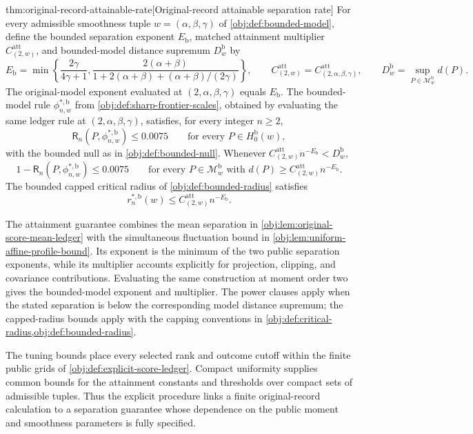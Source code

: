 \documentclass[11pt]{article}
\begin{document}
\begin{theoremv}{thm:original-record-attainable-rate}[Original-record attainable separation rate]
For every admissible smoothness tuple \(w=(\alpha,\beta,\gamma)\) of \cref{obj:def:bounded-model}, define the bounded separation exponent \(E_{\mathrm b}\), matched attainment multiplier \(C^{\mathrm{att}}_{(2,w)}\), and bounded-model distance supremum \(D_w^{\mathrm b}\) by
\[
E_{\mathrm b}
=\min\left\{\frac{2\gamma}{4\gamma+1},
\frac{2(\alpha+\beta)}
{1+2(\alpha+\beta)+(\alpha+\beta)/(2\gamma)}\right\},
\qquad
C^{\mathrm{att}}_{(2,w)}
=C^{\mathrm{att}}_{(2,\alpha,\beta,\gamma)},
\qquad
D_w^{\mathrm b}=\sup_{P\in\mathcal M^{\mathrm b}_w}d(P).
\]
The original-model exponent evaluated at \((2,\alpha,\beta,\gamma)\) equals \(E_{\mathrm b}\). The bounded-model rule \(\phi^{*,\mathrm b}_{n,w}\) from \cref{obj:def:sharp-frontier-scales}, obtained by evaluating the same ledger rule at \((2,\alpha,\beta,\gamma)\), satisfies, for every integer \(n\ge2\),
\[
\mathsf R_n(P,\phi^{*,\mathrm b}_{n,w})\le0.0075
\qquad\text{for every }P\in H_0^{\mathrm b}(w),
\]
with the bounded null as in \cref{obj:def:bounded-null}. Whenever
\(C^{\mathrm{att}}_{(2,w)}n^{-E_{\mathrm b}}<D_w^{\mathrm b}\),
\[
1-\mathsf R_n(P,\phi^{*,\mathrm b}_{n,w})\le0.0075
\qquad
\text{for every }P\in\mathcal M^{\mathrm b}_w
\text{ with }d(P)\ge C^{\mathrm{att}}_{(2,w)}n^{-E_{\mathrm b}}.
\]
The bounded capped critical radius of \cref{obj:def:bounded-radius} satisfies
\[
r_n^{*,\mathrm b}(w)
\le C^{\mathrm{att}}_{(2,w)}n^{-E_{\mathrm b}}.
\]
\end{theoremv}

The attainment guarantee combines the mean separation in \cref{obj:lem:original-score-mean-ledger} with the simultaneous fluctuation bound in \cref{obj:lem:uniform-affine-profile-bound}. Its exponent is the minimum of the two public separation exponents, while its multiplier accounts explicitly for projection, clipping, and covariance contributions. Evaluating the same construction at moment order two gives the bounded-model exponent and multiplier. The power clauses apply when the stated separation is below the corresponding model distance supremum; the capped-radius bounds apply with the capping conventions in \cref{obj:def:critical-radius,obj:def:bounded-radius}.

The tuning bounds place every selected rank and outcome cutoff within the finite public grids of \cref{obj:def:explicit-score-ledger}. Compact uniformity supplies common bounds for the attainment constants and thresholds over compact sets of admissible tuples. Thus the explicit procedure links a finite original-record calculation to a separation guarantee whose dependence on the public moment and smoothness parameters is fully specified.
\end{document}
